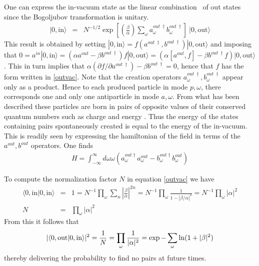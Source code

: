 \documentclass[12pt,oneside]{report}
\def\om{\omega	}
\begin{document}
One can express the in-vacuum state 
as the linear combination~\cite{KaUm}
of out states since the Bogoljubov transformation is unitary.
\begin{eqnarray}
|0, \mbox{in} \rangle & = & N^{-1/2} \exp \left[\left(\frac {\beta}
{ \alpha}\right) \sum_\omega
a^{out\ \dagger }_{\omega} b^{out\ \dagger }_{\omega}\right]
\ |0,\mbox{out} \rangle \label{outvac}
\end{eqnarray}
This result is  obtained by setting $|0, \mbox{in} \rangle =
 f(a^{out\ \dagger },b^{out\ \dagger }) |0,\mbox{out} \rangle $ and 
imposing that $0= a^{in} |0, \mbox{in} \rangle =
(\alpha a^{out} - \beta b^{out\ \dagger } ) 
f |0,\mbox{out} \rangle = 
(\alpha [ a^{out}, f] - \beta b^{out\ \dagger } f)|0,\mbox{out} \rangle$. This in turn
implies that $ \alpha (\partial f / \partial a^{out\ \dagger }) -
 \beta b^{out\ \dagger } =0$, hence that $f$ has the form 
written in \ref{outvac}.
Note that the creation operators $a^{out\ \dagger }_{\omega}, b^{out\ \dagger
}_{\omega}$ appear only as a product. Hence to each produced particle in mode
$p,\om$, there corresponds one and only one antiparticle in mode $a,\om$.
  From what has been
described these particles are born in pairs of opposite values of their
conserved quantum numbers such as charge and energy . Thus the energy of 
the states containing pairs spontaneously created is equal to the energy of
 the in-vacuum. This is readily seen by expressing the hamiltonian of the 
field in terms of the $a^{out}, b^{out}$ operators. One finds
\begin{eqnarray}
H= \int ^{\infty}_{-\infty} d\omega \omega 
(a^{out\dagger }_{\omega}a_{\omega}^{out}
- b^{out\dagger }_{\omega}b_{\omega}^{out}) 
\label{hamiltE}
\end{eqnarray}


To compute the normalization factor $N$ in equation \ref{outvac} we have 
\begin{eqnarray} \langle 0, \mbox{in} |0, \mbox{in} \rangle & = & 1  =  
N^{-1} \prod_\omega\sum_n \left|\frac \beta \alpha \right|^{2n}
=N^{-1} \prod_\omega \frac{1}{1-|\beta/\alpha|^2} = N^{-1}
\prod_\omega |\alpha|^2 \nonumber \\
N & = & \prod_\omega |\alpha|^2 \label{norme}
\end{eqnarray}
\noindent From this it follows
that
\begin{equation}
|\langle 0,\mbox{out}|0,\mbox{in} \rangle|^2 = {1\over N} = \prod_\omega
\frac{1}{|\alpha|^2} = \exp - \sum_\omega \ln (1 + |\beta|^2) \label{inout}
\end{equation}
thereby delivering  the probability to find no pairs at future times.
\end{document}
